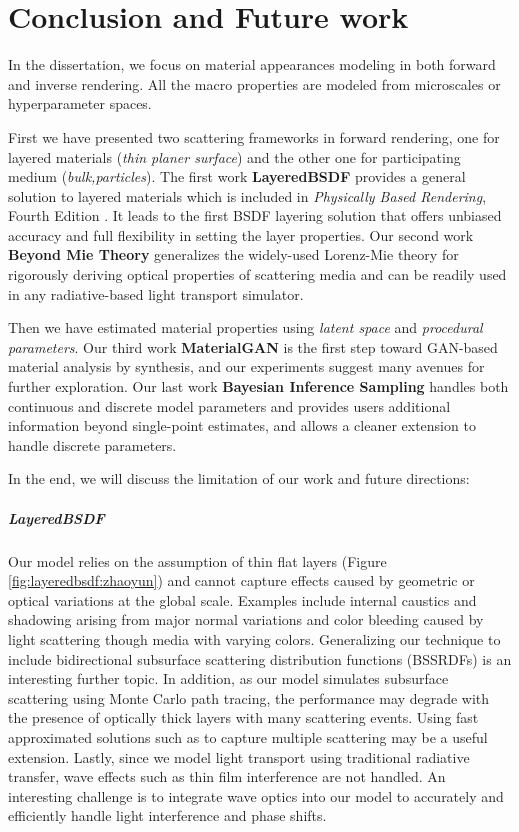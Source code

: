 \chapter{Conclusion and Future work}
\label{cpt:conclusion}

In the dissertation, we focus on material appearances modeling in both forward and inverse rendering. All the macro properties are modeled from microscales or hyperparameter spaces. 

First we have presented two scattering frameworks in forward rendering, one for layered materials (\emph{thin planer surface}) and the other one for participating medium (\emph{bulk,particles}). The first work \textbf{LayeredBSDF} provides a general solution to layered materials which is included in \emph{Physically Based Rendering}, Fourth Edition \cite{pharr2021physically}. It leads to the first BSDF layering solution that offers unbiased accuracy and full flexibility in setting the layer properties.
Our second work \textbf{Beyond Mie Theory} generalizes the widely-used Lorenz-Mie theory for rigorously deriving optical properties of scattering media and can be readily used in any radiative-based light transport simulator.

Then we have estimated material properties using \emph{latent space} and \emph{procedural parameters}. Our third work \textbf{MaterialGAN} is the first step toward GAN-based material analysis by synthesis, and our experiments suggest many avenues for further exploration. Our last work \textbf{Bayesian Inference Sampling} handles both continuous and discrete model parameters and provides users additional information beyond single-point estimates, and allows a cleaner extension to handle discrete parameters.

In the end, we will discuss the limitation of our work and future directions:

\paragraph{LayeredBSDF}
Our model relies on the assumption of thin flat layers (Figure \ref{fig:layeredbsdf:zhaoyun}) and cannot capture effects caused by geometric or optical variations at the global scale.
Examples include internal caustics and shadowing arising from major normal variations and color bleeding caused by light scattering though media with varying colors.
Generalizing our technique to include bidirectional subsurface scattering distribution functions (BSSRDFs) is an interesting further topic.
In addition, as our model simulates subsurface scattering using Monte Carlo path tracing, the performance may degrade with the presence of optically thick layers with many scattering events.
Using fast approximated solutions such as \cite{jensen2001practical,frisvad2014directional} to capture multiple scattering may be a useful extension.
Lastly, since we model light transport using traditional radiative transfer, wave effects such as thin film interference are not handled.
An interesting challenge is to integrate wave optics into our model to accurately and efficiently handle light interference and phase shifts.

